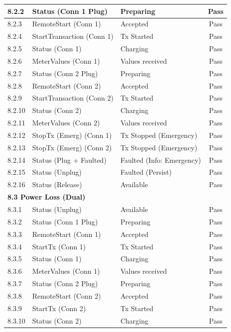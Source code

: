 \documentclass[a4paper,11pt]{report}
\begin{document}
\begin{footnotesize}
\begin{footnotesize}
\begin{longtable}{|p{1.0cm}|p{4.5cm}|p{6.5cm}|c|}
\hline
8.2.2 & Status (Conn 1 Plug) & Preparing & Pass \\
\hline
8.2.3 & RemoteStart (Conn 1) & Accepted & Pass \\
\hline
8.2.4 & StartTransaction (Conn 1) & Tx Started & Pass \\
\hline
8.2.5 & Status (Conn 1) & Charging & Pass \\
\hline
8.2.6 & MeterValues (Conn 1) & Values received & Pass \\
\hline
8.2.7 & Status (Conn 2 Plug) & Preparing & Pass \\
\hline
8.2.8 & RemoteStart (Conn 2) & Accepted & Pass \\
\hline
8.2.9 & StartTransaction (Conn 2) & Tx Started & Pass \\
\hline
8.2.10 & Status (Conn 2) & Charging & Pass \\
\hline
8.2.11 & MeterValues (Conn 2) & Values received & Pass \\
\hline
8.2.12 & StopTx (Emerg) (Conn 1) & Tx Stopped (Emergency) & Pass \\
\hline
8.2.13 & StopTx (Emerg) (Conn 2) & Tx Stopped (Emergency) & Pass \\
\hline
8.2.14 & Status (Plug + Faulted) & Faulted (Info: Emergency) & Pass \\
\hline
8.2.15 & Status (Unplug) & Faulted (Persist) & Pass \\
\hline
8.2.16 & Status (Release) & Available & Pass \\
\hline
\multicolumn{4}{|l|}{\textbf{8.3 Power Loss (Dual)}} \\
\hline
8.3.1 & Status (Unplug) & Available & Pass \\
\hline
8.3.2 & Status (Conn 1 Plug) & Preparing & Pass \\
\hline
8.3.3 & RemoteStart (Conn 1) & Accepted & Pass \\
\hline
8.3.4 & StartTx (Conn 1) & Tx Started & Pass \\
\hline
8.3.5 & Status (Conn 1) & Charging & Pass \\
\hline
8.3.6 & MeterValues (Conn 1) & Values received & Pass \\
\hline
8.3.7 & Status (Conn 2 Plug) & Preparing & Pass \\
\hline
8.3.8 & RemoteStart (Conn 2) & Accepted & Pass \\
\hline
8.3.9 & StartTx (Conn 2) & Tx Started & Pass \\
\hline
8.3.10 & Status (Conn 2) & Charging & Pass \\

\end{longtable}
\end{footnotesize}
\end{footnotesize}
\end{document}
